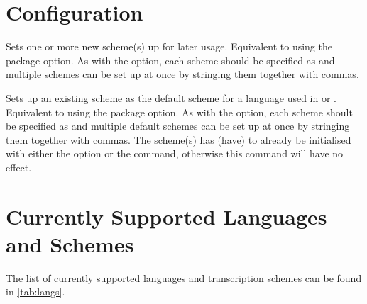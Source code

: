 \documentclass{ltxdockit}
\begin{document}
\section{Configuration}

\begin{ltxsyntax}

Sets one or more new scheme(s) up for later usage. Equivalent to using the
 package option. As with the option, each scheme should
be specified as
 and multiple schemes can be set up at once by
stringing them together with commas.


Sets up an existing scheme as the default scheme for a language used in
 or . Equivalent
to using the  package option. As with the option, each
scheme shoult be specified as  and multiple
default schemes can be set up at once by stringing them together with commas.
The scheme(s) has (have) to already be initialised with either the
 option or the  command,
otherwise this command will have no effect.
\end{ltxsyntax}

\section{Currently Supported Languages and Schemes}

The list of currently supported languages and transcription schemes can be found
in \autoref{tab:langs}.
\end{document}
